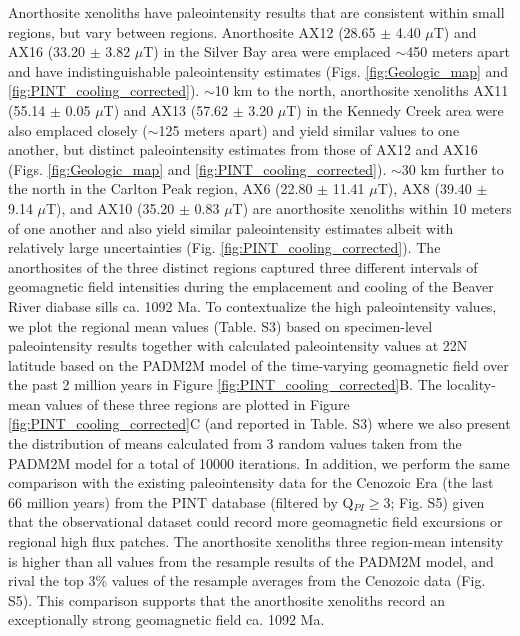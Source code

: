 \documentclass[9pt,twocolumn,twoside,lineno]{pnas-new}
\begin{document}
Anorthosite xenoliths have paleointensity results that are consistent within small regions, but vary between regions. Anorthosite AX12 (28.65 $\pm$ 4.40 $\mu$T) and AX16 (33.20 $\pm$ 3.82 $\mu$T) in the Silver Bay area were emplaced $\sim$450 meters apart and have indistinguishable paleointensity estimates (Figs. \ref{fig:Geologic_map} and \ref{fig:PINT_cooling_corrected}). $\sim$10 km to the north, anorthosite xenoliths AX11 (55.14 $\pm$ 0.05 $\mu$T) and AX13 (57.62 $\pm$ 3.20 $\mu$T) in the Kennedy Creek area were also emplaced closely ($\sim$125 meters apart) and yield similar values to one another, but distinct paleointensity estimates from those of AX12 and AX16 (Figs. \ref{fig:Geologic_map} and \ref{fig:PINT_cooling_corrected}). $\sim$30 km further to the north in the Carlton Peak region, AX6 (22.80 $\pm$ 11.41 $\mu$T), AX8 (39.40 $\pm$ 9.14 $\mu$T), and AX10 (35.20 $\pm$ 0.83 $\mu$T) are anorthosite xenoliths within 10 meters of one another and also yield similar paleointensity estimates albeit with relatively large uncertainties (Fig. \ref{fig:PINT_cooling_corrected}). The anorthosites of the three distinct regions captured three different intervals of geomagnetic field intensities during the emplacement and cooling of the Beaver River diabase sills ca. 1092 Ma. To contextualize the high paleointensity values, we plot the regional mean values (Table. S3) based on specimen-level paleointensity results together with calculated paleointensity values at 22\textdegree N latitude based on the PADM2M model of the time-varying geomagnetic field over the past 2 million years \cite{Ziegler2011a} in Figure \ref{fig:PINT_cooling_corrected}B. The locality-mean values of these three regions are plotted in Figure \ref{fig:PINT_cooling_corrected}C (and reported in Table. S3) where we also present the distribution of means calculated from 3 random values taken from the PADM2M model for a total of 10000 iterations. In addition, we perform the same comparison with the existing paleointensity data for the Cenozoic Era (the last 66 million years) from the PINT database (filtered by Q$_{PI}\geq$3; Fig. S5) given that the observational dataset could record more geomagnetic field excursions or regional high flux patches. The anorthosite xenoliths three region-mean intensity is higher than all values from the resample results of the PADM2M model, and rival the top 3\% values of the resample averages from the Cenozoic data (Fig. S5). This comparison supports that the anorthosite xenoliths record an exceptionally strong geomagnetic field ca. 1092 Ma.
\end{document}
